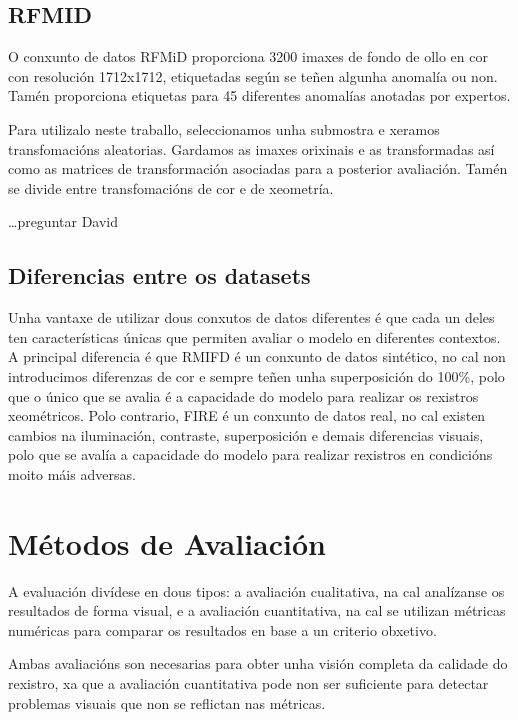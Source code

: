 \subsection{RFMID}
\label{subsec:RFMID}

O conxunto de datos RFMiD \cite{RFMiD} proporciona 3200 imaxes de fondo de ollo en cor con resolución 1712x1712, etiquetadas según se teñen algunha anomalía ou non. 
Tamén proporciona etiquetas para 45 diferentes anomalías anotadas por expertos.

Para utilizalo neste traballo, seleccionamos unha submostra e xeramos transfomacións aleatorias. Gardamos as imaxes orixinais e as transformadas así como as matrices de transformación asociadas para a posterior avaliación.
Tamén se divide entre transfomacións de cor e de xeometría.

\dots preguntar David


\subsection{Diferencias entre os datasets}
\label{subsec:Diferencias entre os datasets}

Unha vantaxe de utilizar dous conxutos de datos diferentes é que cada un deles ten características únicas que permiten avaliar o modelo en diferentes contextos.
A principal diferencia é que RMIFD é un conxunto de datos sintético, no cal non introducimos diferenzas de cor e sempre teñen unha superposición do 100\%, polo que o único que se avalia é a capacidade do modelo para realizar os rexistros xeométricos.
Polo contrario, FIRE é un conxunto de datos real, no cal existen cambios na iluminación, contraste, superposición e demais diferencias visuais, polo que se avalía a capacidade do modelo para realizar rexistros en condicións moito máis adversas.

\section{Métodos de Avaliación}
\label{sec:Métodos de Avaliación}

A evaluación divídese en dous tipos: a avaliación cualitativa, na cal analízanse os resultados de forma visual,
 e a avaliación cuantitativa, na cal se utilizan métricas numéricas para comparar os resultados en base a un criterio obxetivo.

 Ambas avaliacións son necesarias para obter unha visión completa da calidade do rexistro, xa que a avaliación cuantitativa pode non ser suficiente para detectar problemas visuais que non se reflictan nas métricas.

